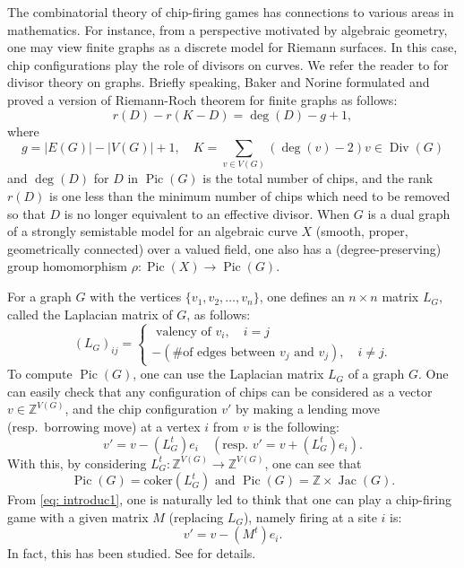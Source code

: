 \documentclass[11pt,reqno]{amsart}
\DeclareMathOperator{\Pic}{Pic}
\DeclareMathOperator{\Jac}{Jac}
\DeclareMathOperator{\Div}{Div}
\theoremstyle{definition}
\theoremstyle{plain}
\begin{document}
The combinatorial theory of chip-firing games has connections to various areas in mathematics. For instance, from a perspective motivated by algebraic geometry, one may view finite graphs as a discrete model for Riemann surfaces. In this case, chip configurations play the role of divisors on curves. We refer the reader to \cite{corry2018divisors} for divisor theory on graphs. Briefly speaking, Baker and Norine \cite{baker2007riemann} formulated and proved a version of Riemann-Roch theorem for finite graphs as follows:
\begin{equation}\label{eq: rr}
r(D) - r(K-D) = \deg(D) -g+1,
\end{equation}
where
\[
g=|E(G)|-|V(G)|+1, \quad K=\sum_{v \in V(G)} (\deg(v)-2)v \in \Div(G)
\]
and $\deg(D)$ for $D$ in $\Pic(G)$ is the total number of chips, and the rank $r(D)$ is one less than the minimum number of chips which need to be removed so that $D$ is no longer equivalent to an effective divisor. When $G$ is a dual graph of a strongly semistable model for an algebraic curve $X$ (smooth, proper, geometrically connected) over a valued field, one also has a (degree-preserving) group homomorphism $\rho:\Pic(X) \to \Pic(G)$. 

For a graph $G$ with the vertices $\{v_1,v_2,\dots,v_n\}$, one defines an $n\times n$ matrix $L_G$, called the Laplacian matrix of $G$, as follows:
\[
(L_G)_{ij}=\begin{cases}
\textrm{ valency of $v_i$}, \quad i=j\\
-(\textrm{\# of edges between $v_j$ and $v_j$}), \quad i \neq j.
\end{cases}
\]
To compute $\Pic(G)$, one can use the Laplacian matrix $L_G$ of a graph $G$. One can easily check that any configuration of chips can be considered as a vector $v \in \mathbb{Z}^{V(G)}$, and the chip configuration $v'$ by making a lending move (resp.~borrowing move) at a vertex $i$ from $v$ is the following:
\begin{equation}\label{eq: introduc1}
v'=v - (L_G^t)e_i \quad (\textrm{resp.~} v'=v + (L_G^t)e_i).
\end{equation}
With this, by considering $L_G^t:\mathbb{Z}^{V(G)} \to \mathbb{Z}^{V(G)}$, one can see that
\[
\Pic(G)=\textrm{coker}(L_G^t) \textrm{ and } \Pic(G)=\mathbb{Z}\times \Jac(G).
\]
From \eqref{eq: introduc1}, one is naturally led to think that one can play a chip-firing game with a given matrix $M$ (replacing $L_G$), namely firing at a site $i$ is:
\begin{equation}\label{eq: introduc2}
v'=v - (M^t)e_i.
\end{equation}
In fact, this has been studied. See \cite[Section 6]{klivans2018mathematics} for details. 
\end{document}
